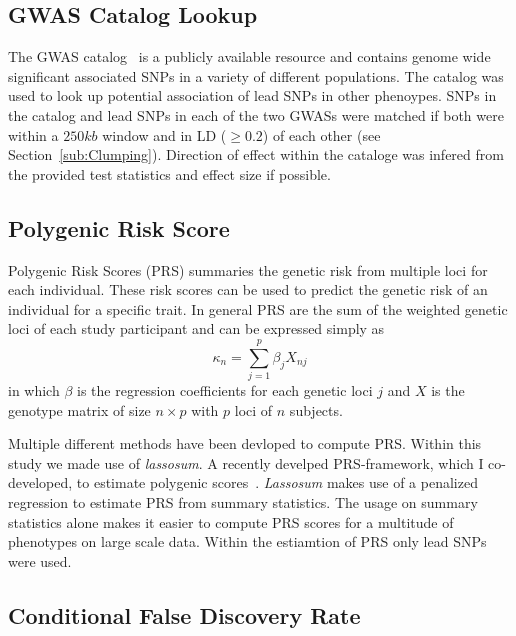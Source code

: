 \subsection{GWAS Catalog Lookup}
\label{sub:GWAS_Cataloge_Lookup}

The GWAS catalog~\cite{Welter2014} is a publicly available resource and contains genome wide significant associated SNPs in a variety of different populations.
The catalog was used to look up potential association of lead SNPs in other phenoypes.
SNPs in the catalog and lead SNPs in each of the two GWASs were matched if both were within a $250kb$ window and in LD ($\ge 0.2$) of each other (see Section~\ref{sub:Clumping}).
Direction of effect within the cataloge was infered from the provided test statistics and effect size if possible.

\subsection{Polygenic Risk Score}
\label{sub:prs}

Polygenic Risk Scores (PRS) summaries the genetic risk from multiple loci for each individual.
These risk scores can be used to predict the genetic risk of an individual for a specific trait.
In general PRS are the sum of the weighted genetic loci of each study participant and can be expressed simply as
\begin{equation}
	\kappa_n = \sum^p_{j=1} \beta_j X_{nj}
\end{equation}
in which $\beta$ is the regression coefficients for each genetic loci $j$ and $X$ is the genotype matrix of size  $n\times p$ with $p$ loci of $n$ subjects.

Multiple different methods have been devloped to compute PRS\@.
Within this study we made use of \textit{lassosum}.
A recently develped PRS-framework, which I co-developed, to estimate polygenic scores~\cite{Mak2016}.
\textit{Lassosum} makes use of a penalized regression to estimate PRS from summary statistics.
The usage on summary statistics alone makes it easier to compute PRS scores for a multitude of phenotypes on large scale data.
Within the estiamtion of PRS only lead SNPs were used.

\subsection{Conditional False Discovery Rate}
\label{sub:conditional_false_discovery_rate}

